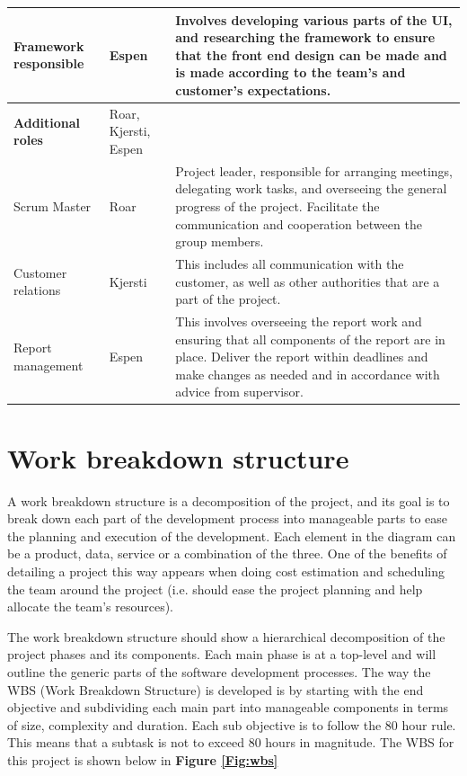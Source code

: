 \begin{table}[!h]
\begin{tabular}{ | p{3.7cm} | p{2.8cm} | p{10.5cm} |}
			Framework responsible & Espen & Involves developing various parts of the UI, and researching the framework to ensure that the front end design can be made and is made according to the team's and customer's expectations. \\ \hline
			
			\textbf{Additional roles} & Roar, Kjersti, Espen & \\ \hline
			
			Scrum Master & Roar & Project leader, responsible for arranging meetings, delegating work tasks, and overseeing the general progress of the project. Facilitate the communication and cooperation between the group members. \\ \hline
			
			Customer relations & Kjersti & This includes all communication with the customer, as well as other authorities that are a part of the project. \\ \hline
			
			Report management & Espen & This involves overseeing the report work and ensuring that all components of the report are in place. Deliver the report within deadlines and make changes as needed and in accordance with advice from supervisor. \\ \hline
		\end{tabular}
	\label{Tab:roles}
\end{table}

\section{Work breakdown structure}

A work breakdown structure is a decomposition of the project, and its goal is to break down each part of the development process into manageable parts to ease the planning and execution of the development. Each element in the diagram can be a product, data, service or a combination of the three. One of the benefits of detailing a project this way appears when doing cost estimation and scheduling the team around the project (i.e. should ease the project planning and help allocate the team's resources).\newline

The work breakdown structure should show a hierarchical decomposition of the project phases and its components. Each main phase is at a top-level and will outline the generic parts of the software development processes. The way the WBS (Work Breakdown Structure) is developed is by starting with the end objective and subdividing each main part into manageable components in terms of size, complexity and duration. Each sub objective is to follow the 80 hour rule. This means that a subtask is not to exceed 80 hours in magnitude. The WBS for this project is shown below in \textbf{Figure \ref{Fig:wbs}}

